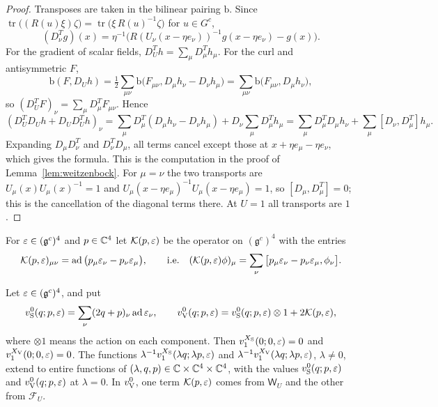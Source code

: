 \begin{proof}
Transposes are taken in the bilinear pairing $\mathrm b$. Since $\operatorname{tr}\big((R(u)\xi)\zeta\big)=\operatorname{tr}\big(\xi\,R(u)^{-1}\zeta\big)$ for $u\in G^c$,
\[
(D_\nu^Tg)(x)=\eta^{-1}\big(R(U_\nu(x-\eta e_\nu))^{-1}g(x-\eta e_\nu)-g(x)\big).
\]
For the gradient of scalar fields, $D_U^Th=\sum_\mu D_\mu^Th_\mu$. For the curl and antisymmetric $F$,
\[
\mathrm b(F,D_Uh)=\tfrac12\sum_{\mu\nu}\mathrm b\big(F_{\mu\nu},D_\mu h_\nu-D_\nu h_\mu\big)=\sum_{\mu\nu}\mathrm b\big(F_{\mu\nu},D_\mu h_\nu\big),
\]
so $(D_U^TF)_\nu=\sum_\mu D_\mu^TF_{\mu\nu}$. Hence
\[
(D_U^TD_Uh+D_UD_U^Th)_\nu=\sum_\mu D_\mu^T(D_\mu h_\nu-D_\nu h_\mu)+D_\nu\sum_\mu D_\mu^Th_\mu=\sum_\mu D_\mu^TD_\mu h_\nu+\sum_\mu[D_\nu,D_\mu^T]h_\mu .
\]
Expanding $D_\mu D_\nu^T$ and $D_\nu^TD_\mu$, all terms cancel except those at $x+\eta e_\mu-\eta e_\nu$, which gives the formula. This is the computation in the proof of Lemma~\ref{lem:weitzenbock}. For $\mu=\nu$ the two transports are $U_\mu(x)U_\mu(x)^{-1}=1$ and $U_\mu(x-\eta e_\mu)^{-1}U_\mu(x-\eta e_\mu)=1$, so $[D_\mu,D_\mu^T]=0$; this is the cancellation of the diagonal terms there. At $U=1$ all transports are $1$.
\end{proof}

For $\varepsilon\in(\mathfrak g^c)^4$ and $p\in\mathbb C^4$ let $\mathcal K(p,\varepsilon)$ be the operator on $(\mathfrak g^c)^4$ with the entries
\[
\mathcal K(p,\varepsilon)_{\mu\nu}=\operatorname{ad}\big(p_\mu\varepsilon_\nu-p_\nu\varepsilon_\mu\big),\qquad\text{i.e.}\quad(\mathcal K(p,\varepsilon)\phi)_\mu=\sum_\nu\big[p_\mu\varepsilon_\nu-p_\nu\varepsilon_\mu,\phi_\nu\big].
\]

\begin{lemma}\label{lem:ol-naive-limit}
Let $\varepsilon\in(\mathfrak g^c)^4$, and put
\[
v^0_{\rm S}(q;p,\varepsilon)=\sum_\nu(2q+p)_\nu\operatorname{ad}\varepsilon_\nu,\qquad v^0_{\rm V}(q;p,\varepsilon)=v^0_{\rm S}(q;p,\varepsilon)\otimes1+2\mathcal K(p,\varepsilon),
\]
where $\otimes1$ means the action on each component. Then $v_1^{X_{\rm S}}(0;0,\varepsilon)=0$ and $v_1^{X_{\rm V}}(0;0,\varepsilon)=0$. The functions $\lambda^{-1}v_1^{X_{\rm S}}(\lambda q;\lambda p,\varepsilon)$ and $\lambda^{-1}v_1^{X_{\rm V}}(\lambda q;\lambda p,\varepsilon)$, $\lambda\ne0$, extend to entire functions of $(\lambda,q,p)\in\mathbb C\times\mathbb C^4\times\mathbb C^4$, with the values $v^0_{\rm S}(q;p,\varepsilon)$ and $v^0_{\rm V}(q;p,\varepsilon)$ at $\lambda=0$. In $v^0_{\rm V}$, one term $\mathcal K(p,\varepsilon)$ comes from $\mathsf W_U$ and the other from $\mathcal F_U$.
\end{lemma}

